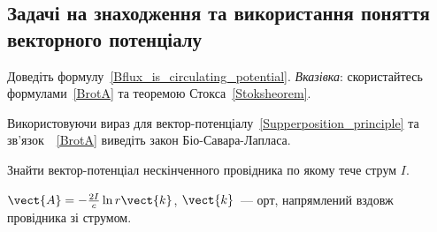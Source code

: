 
\subsection*{Задачі на знаходження та використання поняття векторного потенціалу}

\begin{problem}
    Доведіть формулу~\ref{Bflux_is_circulating_potential}.
	\emph{Вказівка}: скористайтесь формулами~\eqref{BrotA} та теоремою Стокса~\eqref{Stoksheorem}.
\end{problem}

\begin{problem}
    Використовуючи вираз для вектор-потенціалу~\eqref{Supperposition_principle} та зв'язок~~\eqref{BrotA} виведіть закон Біо-Савара-Лапласа.
\end{problem}



\begin{problem}
Знайти вектор-потенціал нескінченного провідника по якому тече струм $I$.
\begin{solution}
	$\vect{A} =-  \frac{2I}{c}\ln r \vect{k}$, $\vect{k}$~--- орт, напрямлений вздовж провідника зі струмом.
\end{solution}
\end{problem}

